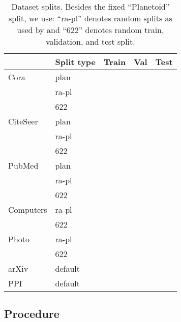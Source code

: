 \documentclass[runningheads]{llncs}
\begin{document}
\begin{table}[!ht]
    \centering
    \caption{Dataset splits. Besides the fixed ``Planetoid'' split, we use: ``ra-pl'' denotes random splits as used by \cite{Shchur18pitfalls} and ``622'' denotes random  train,  validation, and  test split.}
    \label{tab:ds_splits}
\small    
    \begin{tabular}{l|l|r|r|r}\toprule
          & Split type & Train  & Val     & Test  \\ \midrule
         Cora    & plan    &   &   &  \\
                 &ra-pl&   &   &  \\
                 & 622   & &   &   \\
         CiteSeer& plan    &   &   &  \\
                 &ra-pl&   &   &  \\
                 & 622   & &   &   \\
         PubMed  & plan    &    &   & \\
                 &ra-pl&    &    &\\
                 & 622   && & \\ \midrule
        Computers& ra-pl &  &  & \\
                 & 622 &  &  &  \\
        Photo   & ra-pl &  &  & \\
                 & 622 &  &  & \\ \midrule
         arXiv &default&&&\\ 
       PPI       &default&  &  & \\ \bottomrule
    \end{tabular}
\end{table}



\subsection{Procedure}
\label{sec:proc}
\end{document}
